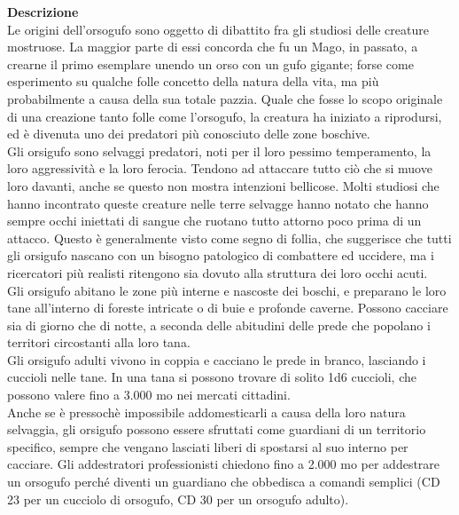 \begin{multicols}{2}
\textbf{Descrizione}\\
Le origini dell’orsogufo sono oggetto di dibattito fra gli studiosi delle creature mostruose. La maggior parte di essi concorda che fu un Mago, in passato, a crearne il primo esemplare unendo un orso con un gufo gigante; forse come esperimento su qualche folle concetto della natura della vita, ma più probabilmente a causa della sua totale pazzia. Quale che fosse lo scopo originale di una creazione tanto folle come l’orsogufo, la creatura ha iniziato a riprodursi, ed è divenuta uno dei predatori più conosciuto delle zone boschive.\\
Gli orsigufo sono selvaggi predatori, noti per il loro pessimo temperamento, la loro aggressività e la loro ferocia. Tendono ad attaccare tutto ciò che si muove loro davanti, anche se questo non mostra intenzioni bellicose. Molti studiosi che hanno incontrato queste creature nelle terre selvagge hanno notato che hanno sempre occhi iniettati di sangue che ruotano tutto attorno poco prima di un attacco. Questo è generalmente visto come segno di follia, che suggerisce che tutti gli orsigufo nascano con un bisogno patologico di combattere ed uccidere, ma i ricercatori più realisti ritengono sia dovuto alla struttura dei loro occhi acuti.\\
Gli orsigufo abitano le zone più interne e nascoste dei boschi, e preparano le loro tane all’interno di foreste intricate o di buie e profonde caverne. Possono cacciare sia di giorno che di notte, a seconda delle abitudini delle prede che popolano i territori circostanti alla loro tana.\\
Gli orsigufo adulti vivono in coppia e cacciano le prede in branco, lasciando i cuccioli nelle tane. In una tana si possono trovare di solito 1d6 cuccioli, che possono valere fino a 3.000 mo nei mercati cittadini.\\

Anche se è pressochè impossibile addomesticarli a causa della loro natura selvaggia, gli orsigufo possono essere sfruttati come guardiani di un territorio specifico, sempre che vengano lasciati liberi di spostarsi al suo interno per cacciare. Gli addestratori professionisti chiedono fino a 2.000 mo per addestrare un orsogufo perché diventi un guardiano che obbedisca a comandi semplici (CD 23 per un cucciolo di orsogufo, CD 30 per un orsogufo adulto).\\


\end{multicols}

